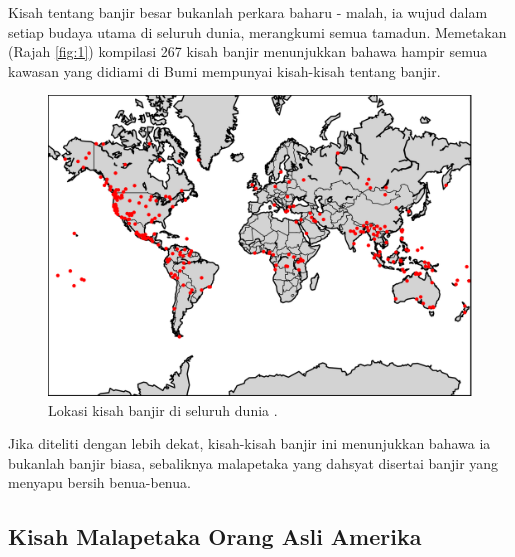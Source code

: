 \documentclass[10pt,twocolumn,letterpaper]{article}
\begin{document}
Kisah tentang banjir besar bukanlah perkara baharu - malah, ia wujud dalam setiap budaya utama di seluruh dunia, merangkumi semua tamadun. Memetakan (Rajah \ref{fig:1}) kompilasi 267 kisah banjir \cite{3} menunjukkan bahawa hampir semua kawasan yang didiami di Bumi mempunyai kisah-kisah tentang banjir.

\begin{figure}[h]
\begin{center}
   \includegraphics[width=1\linewidth]{b.png}
\end{center}
   \caption{Lokasi kisah banjir di seluruh dunia \cite{3}.}
\label{fig:1}
\label{fig:onecol}
\end{figure}

Jika diteliti dengan lebih dekat, kisah-kisah banjir ini menunjukkan bahawa ia bukanlah banjir biasa, sebaliknya malapetaka yang dahsyat disertai banjir yang menyapu bersih benua-benua.

\subsection{Kisah Malapetaka Orang Asli Amerika}
\end{document}
